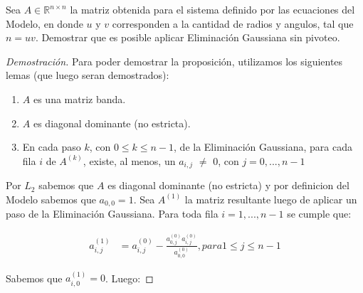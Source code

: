 \begin{proposition}
    Sea $A \in \mathbb{R}^{n \times n}$ la matriz obtenida para el sistema definido por las ecuaciones del Modelo, en donde $u$ y $v$ corresponden a la cantidad de radios y angulos, tal que $n = uv$. Demostrar que es posible aplicar Eliminación Gaussiana sin pivoteo.
\end{proposition}
\begin{proof}[Demostración]
  Para poder demostrar la proposición, utilizamos los siguientes lemas (que luego seran demostrados):

  \begin{enumerate}[label=(\subscript{L}{\arabic*})]
    \item $A$ es una matriz banda.
    \item $A$ es diagonal dominante (no estricta).
    \item En cada paso $k$, con $0 \leq k \leq n-1$, de la Eliminación Gaussiana, para cada fila $i$ de $A^{(k)}$, existe, al menos, un $a_{i,j}$ $\neq$ 0, con $j = 0,..., n-1$
  \end{enumerate}

Por $L_{2}$ sabemos que $A$ es diagonal dominante (no estricta) y por definicion del Modelo sabemos que $a_{0,0} = 1$. Sea $A^{(1)}$ la matriz resultante luego de aplicar un paso de la Eliminación Gaussiana. Para toda fila $i = 1,...,n-1$ se cumple que:

\begin{equation*}
    \begin{aligned}
      a^{(1)}_{i,j} &= a^{(0)}_{i,j} - \frac{a^{(0)}_{0,j}a^{(0)}_{i,j}}{a^{(0)}_{0,0}}, para 1 \leq j \leq n-1
    \end{aligned}
\end{equation*}

Sabemos que $a^{(1)}_{i,0} = 0$. Luego:


\end{proof}
